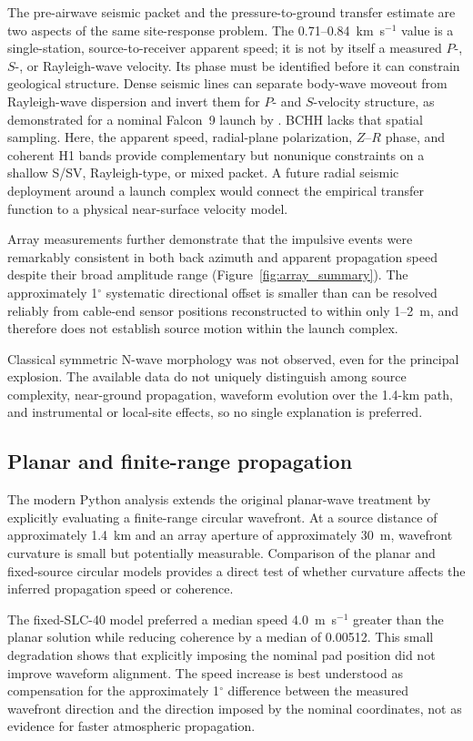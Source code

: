 \documentclass[]{seismica}
\begin{document}
The pre-airwave seismic packet and the pressure-to-ground transfer estimate are
two aspects of the same site-response problem. The 0.71--0.84~km~s$^{-1}$ value
is a single-station, source-to-receiver apparent speed; it is not by itself a
measured $P$-, $S$-, or Rayleigh-wave velocity. Its phase must be identified
before it can constrain geological structure. Dense seismic lines can separate
body-wave moveout from Rayleigh-wave dispersion and invert them for $P$- and
$S$-velocity structure, as demonstrated for a nominal Falcon~9 launch by
\citet{schuster_rocketquake_2025}. BCHH lacks that spatial sampling. Here, the
apparent speed, radial-plane polarization, $Z$--$R$ phase, and coherent H1 bands
provide complementary but nonunique constraints on a shallow S/SV,
Rayleigh-type, or mixed packet. A future radial seismic deployment around a
launch complex would connect the empirical transfer function to a physical
near-surface velocity model.

Array measurements further demonstrate that the impulsive events were
remarkably consistent in both back azimuth and apparent propagation speed
despite their broad amplitude range (Figure~\ref{fig:array_summary}). The
approximately 1$^\circ$ systematic directional offset is smaller than can be
resolved reliably from cable-end sensor positions reconstructed to within only
1--2~m, and therefore does not establish source motion within the launch
complex.

Classical symmetric N-wave morphology was not observed, even for the
principal explosion. The available data do not uniquely distinguish among
source complexity, near-ground propagation, waveform evolution over the
1.4-km path, and instrumental or local-site effects, so no single explanation
is preferred.

\subsection{Planar and finite-range propagation}
\label{sec:discussion_propagation}

The modern Python analysis extends the original planar-wave treatment by explicitly evaluating a finite-range circular wavefront. At a source distance of approximately 1.4~km and an array aperture of approximately 30~m, wavefront curvature is small but potentially measurable. Comparison of the planar and fixed-source circular models provides a direct test of whether curvature affects the inferred propagation speed or coherence.

The fixed-SLC-40 model preferred a median speed 4.0~m~s$^{-1}$ greater than the
planar solution while reducing coherence by a median of 0.00512. This small
degradation shows that explicitly imposing the nominal pad position did not
improve waveform alignment. The speed increase is best understood as
compensation for the approximately 1$^\circ$ difference between the measured
wavefront direction and the direction imposed by the nominal coordinates, not
as evidence for faster atmospheric propagation.
\end{document}
